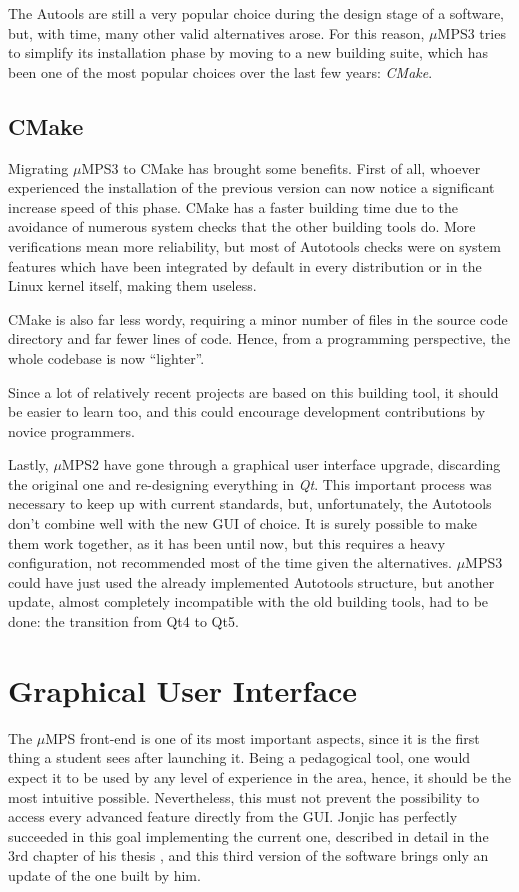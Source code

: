 \documentclass[12pt,a4paper,openright,twoside]{report}
\begin{document}
The Autools are still a very popular choice during the design stage of a software, but, with time, many other valid alternatives arose.
For this reason, $\mu$MPS3 tries to simplify its installation phase by moving to a new building suite, which has been one of the most popular choices over the last few years: \textit{CMake}.

\subsection{CMake}
Migrating $\mu$MPS3 to CMake has brought some benefits.
First of all, whoever experienced the installation of the previous version can now notice a significant increase speed of this phase.
CMake has a faster building time due to the avoidance of numerous system checks that the other building tools do.
More verifications mean more reliability, but most of Autotools checks were on system features which have been integrated by default in every distribution or in the Linux kernel \cite{linux_kernel} itself, making them useless.

CMake is also far less wordy, requiring a minor number of files in the source code directory and far fewer lines of code.
Hence, from a programming perspective, the whole codebase is now ``lighter''.

Since a lot of relatively recent projects are based on this building tool, it should be easier to learn too, and this could encourage development contributions by novice programmers.

Lastly, $\mu$MPS2 have gone through a graphical user interface upgrade, discarding the original one and re-designing everything in \textit{Qt}.
This important process was necessary to keep up with current standards, but, unfortunately, the Autotools don't combine well with the new GUI of choice.
It is surely possible to make them work together, as it has been until now, but this requires a heavy configuration, not recommended most of the time given the alternatives.
$\mu$MPS3 could have just used the already implemented Autotools structure, but another update, almost completely incompatible with the old building tools, had to be done: the transition from Qt4 to Qt5.

\section{Graphical User Interface}
The $\mu$MPS front-end is one of its most important aspects, since it is the first thing a student sees after launching it.
Being a pedagogical tool, one would expect it to be used by any level of experience in the area, hence, it should be the most intuitive possible.
Nevertheless, this must not prevent the possibility to access every advanced feature directly from the GUI.
Jonjic has perfectly succeeded in this goal implementing the current one, described in detail in the 3rd chapter of his thesis \cite{tjonjic}, and this third version of the software brings only an update of the one built by him.
\end{document}
